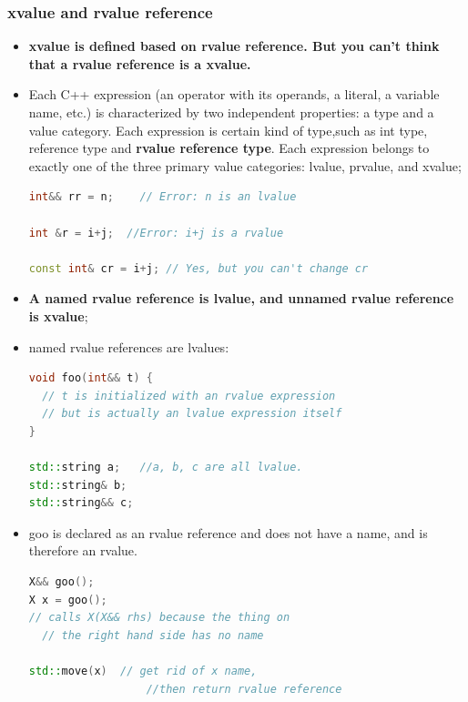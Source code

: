 \documentclass[a4paper,12pt,twoside]{book}
\begin{document}
\subsubsection{xvalue and rvalue reference}

\begin{itemize}

\item \textbf{xvalue is defined based on rvalue reference. But you can't think that a rvalue reference is a xvalue. }

\item Each C++ expression (an operator with its operands, a literal, a variable name, etc.) is characterized by two independent properties: a type and a value category. Each expression is certain kind of type,such as int type, reference type and \textbf{rvalue reference type}. Each expression belongs to exactly one of the three primary value categories: lvalue, prvalue, and xvalue;

\begin{lstlisting}[frame=single, language=c++]
int&& rr = n;    // Error: n is an lvalue

int &r = i+j;  //Error: i+j is a rvalue

const int& cr = i+j; // Yes, but you can't change cr
\end{lstlisting}

\item \textbf{A named rvalue reference is lvalue, and unnamed rvalue reference is xvalue};

\item named rvalue references are lvalues:
\begin{lstlisting}[frame=single, language=c++]
void foo(int&& t) {
  // t is initialized with an rvalue expression
  // but is actually an lvalue expression itself
}

std::string a;   //a, b, c are all lvalue.
std::string& b;
std::string&& c;
\end{lstlisting}


\item goo is declared as an rvalue reference and does not have a name, and is therefore an rvalue.
\begin{lstlisting}[frame=single, language=c++]
X&& goo();
X x = goo();
// calls X(X&& rhs) because the thing on
  // the right hand side has no name

std::move(x)  // get rid of x name,
                  //then return rvalue reference
\end{lstlisting}


\end{itemize}
\end{document}
